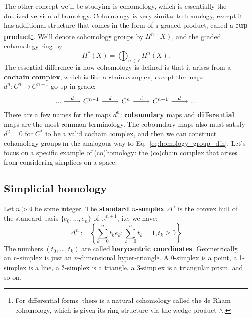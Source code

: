 \documentclass[12pt, oneside]{article}   	%
\theoremstyle{definition}
\begin{document}
The other concept we'll be studying is cohomology, which is essentially the dualized version of homology. Cohomology is very similar to homology, except it has additional structure that comes in the form of a graded product, called a \textbf{cup product}\footnote{For differential forms, there is a natural cohomology called the de Rham cohomology, which is given its ring structure via the wedge product $\wedge$.}. We'll denote cohomology groups by $H^n(X)$, and the graded cohomology ring by 
\begin{equation}
	H^*(X) = \bigoplus_{n\in\mathbb Z} H^n(X). 
\end{equation}
The essential difference in how cohomology is defined is that it arises from a \textbf{cochain complex}, which is like a chain complex, except the maps $d^n : C^n\rightarrow C^{n + 1}$ go up in grade:
\begin{equation}\begin{tikzcd}
		...\arrow[r, "d"] & C^{n - 1}\arrow[r, "d"] & C^n\arrow[r, "d"] & C^{n + 1}\arrow[r, "d"] & ...
\end{tikzcd}\end{equation}
There are a few names for the maps $d^n$: \textbf{coboundary} maps and \textbf{differential} maps are the most common terminology. The coboundary maps also must satisfy $d^2 = 0$ for $C^*$ to be a valid cochain complex, and then we can construct cohomology groups in the analogous way to Eq.~\eqref{eq:homology_group_dfn}. Let's focus on a specific example of (co)homology: the (co)chain complex that arises from considering simplices on a space. 

\subsection{Simplicial homology}

Let $n > 0$ be some integer. The \textbf{standard $n$-simplex} $\Delta^n$ is the convex hull of the standard basis $\{e_0, ..., e_n\}$ of $\mathbb R^{n + 1}$, i.e. we have:
\begin{equation}
	\Delta^n := \left\{\sum_{k = 0}^n t_k e_k : \sum_{k = 0}^n t_k = 1, t_k\geq 0\right\}
\end{equation}
The numbers $(t_0, ..., t_k)$ are called \textbf{barycentric coordinates}. Geometrically, an $n$-simplex is just an $n$-dimensional hyper-triangle. A 0-simplex is a point, a 1-simplex is a line, a 2-simplex is a triangle, a 3-simplex is a triangular prism, and so on. 
\end{document}
